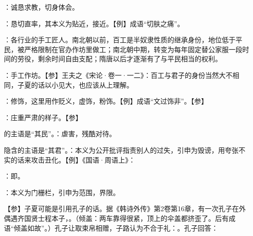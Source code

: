 {
\item {}：诚恳求教，切身体会。

：恳切直率，其本义为贴近，接近。【例】成语“切肤之痛”。
}
{}


{
\item {}：各行业的手工匠人。南北朝以前，百工是半奴隶性质的继承身份，地位低于平民，被严格限制在官办作坊里做工；南北朝中期，转变为每年固定替公家服一段时间的劳役，剩余时间自由支配；隋唐以后才逐渐有了与平民相当的权利。
\item {}：手工作坊。【参】王夫之《宋论·卷一·一二》：百工与君子的身份当然大不相同，子夏的话以小见大，也应该从上理解。
}
{}


{
\item {}：修饰，这里用作贬义，虚饰，粉饰。【例】成语“文过饰非”。【参】
}
{}


{
\item {}：庄重严肃的样子。【参】
}
{}


{
\item {}的主语是“其民”。：虐害，残酷对待。
\item {}隐含的主语是“其君”。：本义为公开批评指责别人的过失，引申为毁谤，用夸张不实的话来攻击丑化。【例】《国语·周语上》：
}
{}


{
\begin{lyitemize}
\item {}：即。
\item {}：本义为门栅栏，引申为范围，界限。
\end{lyitemize}
【参】子夏可能是引用孔子的话。据《韩诗外传》第2卷第16章，有一次孔子在外偶遇齐国贤士程本子，。（倾盖：两车靠得很紧，顶上的伞盖都挤歪了。后有成语“倾盖如故”。）孔子让取束帛相赠，子路认为不合于礼：。孔子回答：
}
{}


